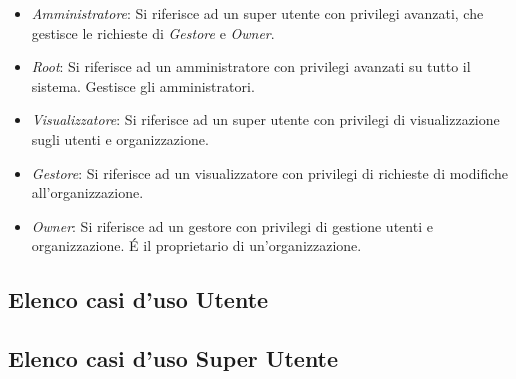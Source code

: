 \documentclass[../analisi-dei-requisiti]{subfiles}
\begin{document}
\begin{itemize}
  \item \emph{Amministratore}: Si riferisce ad un super utente con privilegi avanzati, che gestisce le richieste di \emph{Gestore} e \emph{Owner}.
  \item \emph{Root}: Si riferisce ad un amministratore con privilegi avanzati su tutto il sistema. Gestisce gli amministratori.
  \item \emph{Visualizzatore}: Si riferisce ad un super utente con privilegi di visualizzazione sugli utenti e organizzazione.
  \item \emph{Gestore}: Si riferisce ad un visualizzatore con privilegi di richieste di modifiche all'organizzazione.
  \item \emph{Owner}: Si riferisce ad un gestore con privilegi di gestione utenti e organizzazione. É il proprietario di un'organizzazione.
\end{itemize}

\subsection{Elenco casi d'uso Utente}
\label{sub:casi_duso_utente}


\subsection{Elenco casi d'uso Super Utente}
\label{sub:casi_duso_superutente}


\end{document}
